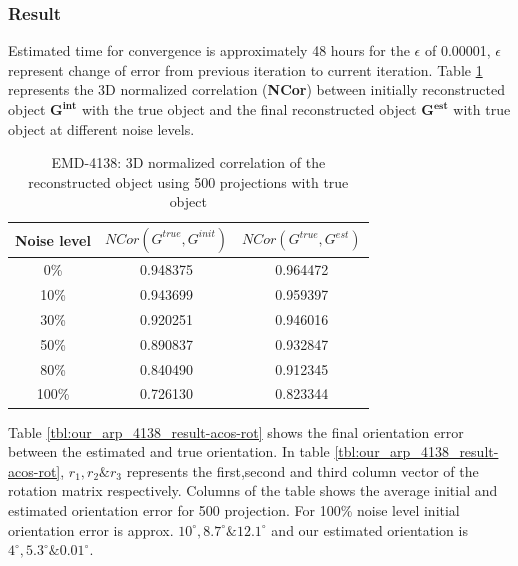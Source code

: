 \documentclass{report}
\begin{document}
\subsubsection{Result}

Estimated time for convergence is approximately 48 hours for the $\epsilon$  of 0.00001, $\epsilon$ represent change of error from previous iteration to current iteration. Table \ref{tbl:our_arp_4138_result-3d-correlation} represents the 3D normalized correlation (\textbf{NCor}) between initially reconstructed object $\boldsymbol{G^{int}}$ with the true object and the final reconstructed object $\boldsymbol{G^{est}}$ with true object at different noise levels. 

\begin{table}[H]
    \centering
     \begin{tabular}{||c c c||} 
             \hline
             Noise level & $NCor(G^{true},G^{init})$  &  $NCor(G^{true},G^{est})$ \\ 
             \hline\hline
             0\% & 0.948375 & 0.964472 \\
             \hline
             10\% & 0.943699 & 0.959397 \\
             \hline
             30\% & 0.920251 & 0.946016 \\
             \hline
             50\% & 0.890837 & 0.932847 \\
             \hline
             80\% & 0.840490 & 0.912345 \\
             \hline
             100\% & 0.726130 & 0.823344 \\ [1ex] 
             \hline
    \end{tabular}
    \captionsetup{justification=centering}
    \caption{EMD-4138: 3D normalized correlation of the reconstructed object using 500 projections with true object }
    \label{tbl:our_arp_4138_result-3d-correlation}
\end{table}

Table \ref{tbl:our_arp_4138_result-acos-rot} shows the final orientation error between the estimated and true orientation. In table \ref{tbl:our_arp_4138_result-acos-rot}, $r_1,r_2 \& r_3$ represents the first,second and third column vector of the rotation matrix respectively. Columns of the table shows the average initial and estimated orientation error for 500 projection. For 100\% noise level initial orientation error is approx. $10^\circ, 8.7^\circ \& 12.1^\circ$ and our estimated orientation is $4^\circ,5.3^\circ \& 0.01^\circ$. 
\end{document}
